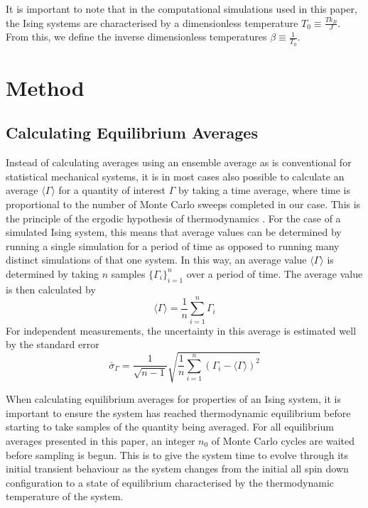 \documentclass[11pt]{iopart}
\begin{document}
It is important to note that in the computational simulations used in this paper, the Ising systems are characterised by a dimensionless temperature $T_0 \equiv \frac{T k_B}{J}$. From this, we define the inverse dimensionless temperatures $\beta \equiv \frac{1}{T_0}$.

\section{Method}

\subsection{Calculating Equilibrium Averages}

Instead of calculating averages using an ensemble average as is conventional for statistical mechanical systems, it is in most cases also possible to calculate an average $\langle \Gamma \rangle$ for a quantity of interest $\Gamma$ by taking a time average, where time is proportional to the number of Monte Carlo sweeps completed in our case. This is the principle of the ergodic hypothesis of thermodynamics \cite{statmech}.  For the case of a simulated Ising system, this means that average values can be determined by running a single simulation for a period of time as opposed to running many distinct simulations of that one system. In this way, an average value $\langle \Gamma \rangle$ is determined by taking $n$ samples $\{ \Gamma_i \}_{i=1}^{n}$ over a period of time. The average value is then calculated by
\begin{equation}
\label{eq:averages}
\langle \Gamma \rangle = \frac{1}{n}\sum_{i=1}^{n} \Gamma_i
\end{equation}
For independent measurements, the uncertainty in this average is estimated well by the standard error \cite{handout}
\begin{equation}
\label{eq:standarderror}
\bar{\sigma}_{\Gamma} = \frac{1}{\sqrt{n-1}} \sqrt{ \frac{1}{n} \sum_{i=1}^{n} \left( \Gamma_i - \langle \Gamma \rangle \right)^2 }
\end{equation}

When calculating equilibrium averages for properties of an Ising system, it is important to ensure the system has reached thermodynamic equilibrium before starting to take samples of the quantity being averaged. For all equilibrium averages presented in this paper, an integer $n_0$ of Monte Carlo cycles are waited before sampling is begun. This is to give the system time to evolve through its initial transient behaviour as the system changes from the initial all spin down configuration to a state of equilibrium characterised by the thermodynamic temperature of the system.
\end{document}
